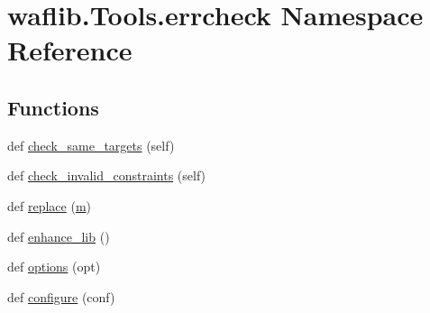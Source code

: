 \hypertarget{namespacewaflib_1_1_tools_1_1errcheck}{}\section{waflib.\+Tools.\+errcheck Namespace Reference}
\label{namespacewaflib_1_1_tools_1_1errcheck}
\subsection*{Functions}
\begin{DoxyCompactItemize}
\item 
def \hyperlink{namespacewaflib_1_1_tools_1_1errcheck_abfda92de66a72045068f150db1f86e29}{check\+\_\+same\+\_\+targets} (self)
\item 
def \hyperlink{namespacewaflib_1_1_tools_1_1errcheck_a77b03ce1d3ecfd9295275ce9685d1c80}{check\+\_\+invalid\+\_\+constraints} (self)
\item 
def \hyperlink{namespacewaflib_1_1_tools_1_1errcheck_a3c373d095646ee41f81dd43ade9e0b63}{replace} (\hyperlink{layer3_8c_a4b8bfe70f28d6faddcb10d6ecf8c1989}{m})
\item 
def \hyperlink{namespacewaflib_1_1_tools_1_1errcheck_a7752dc841ad9140b7f0dc591120a6a0d}{enhance\+\_\+lib} ()
\item 
def \hyperlink{namespacewaflib_1_1_tools_1_1errcheck_ac059af9fc4bbe227373b3081aef0221d}{options} (opt)
\item 
def \hyperlink{namespacewaflib_1_1_tools_1_1errcheck_a8456470882cfc53f245e965934344c2f}{configure} (conf)
\end{DoxyCompactItemize}
